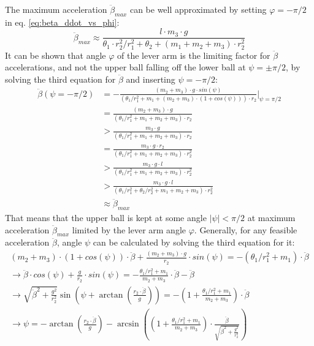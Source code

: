\documentclass{article}
\begin{document}
The maximum acceleration $\ddot{\beta}_{max}$ can be well approximated by setting $\varphi = -\pi/2$ in eq. \ref{eq:beta_ddot_vs_phi}:
\begin{equation}
\ddot{\beta}_{max} \approx \frac{l \cdot m_3 \cdot g}{\theta_1 \cdot r_2^2/r_1^2 + \theta_2 + (m_1 + m_2 + m_3) \cdot r_2^2}
\label{eq:beta_ddot_max}
\end{equation}
It can be shown that angle $\varphi$ of the lever arm is the limiting factor for $\ddot{\beta}$ accelerations, and not the upper ball falling off the lower ball at $\psi = \pm \pi/2$, by solving the third equation for $\ddot{\beta}$ and inserting $\psi = -\pi/2$:
\begin{align*}
\ddot{\beta}(\psi=-\pi/2) &= -\frac{(m_2+m_3) \cdot g \cdot sin(\psi)}{(\theta_1/r_1^2  + m_1 + (m_2+m_3) \cdot (1+cos(\psi))) \cdot r_2} \Big|_{\psi=\pi/2} \\
&= \frac{(m_2+m_3) \cdot g}{(\theta_1/r_1^2  + m_1 + m_2 + m_3) \cdot r_2} \\
&> \frac{m_3 \cdot g}{(\theta_1/r_1^2  + m_1 + m_2 + m_3) \cdot r_2} \\
&= \frac{m_3 \cdot g \cdot r_2}{(\theta_1/r_1^2  + m_1 + m_2 + m_3) \cdot r_2^2} \\
&> \frac{m_3 \cdot g \cdot l}{(\theta_1/r_1^2  + m_1 + m_2 + m_3) \cdot r_2^2} \\
&> \frac{m_3 \cdot g \cdot l}{(\theta_1/r_1^2 + \theta_2/r_2^2 + m_1 + m_2 + m_3) \cdot r_2^2} \\
&\approx \ddot{\beta}_{max}
\end{align*}
That means that the upper ball is kept at some angle $|\psi|<\pi/2$ at maximum acceleration $\ddot{\beta}_{max}$ limited by the lever arm angle $\varphi$.
Generally, for any feasible acceleration $\ddot{\beta}$, angle $\psi$ can be calculated by solving the third equation for it:
\begin{align}
(m_2+m_3) \cdot (1+cos(\psi)) \cdot \ddot{\beta} + \frac{(m_2+m_3) \cdot g}{r_2} \cdot sin(\psi) = -(\theta_1/r_1^2  + m_1) \cdot \ddot{\beta} \nonumber \\
\rightarrow \ddot{\beta} \cdot cos(\psi) + \frac{g}{r_2} \cdot sin(\psi) = -\frac{\theta_1/r_1^2  + m_1}{m_2+m_3} \cdot \ddot{\beta} - \ddot{\beta} \nonumber \\
\rightarrow \sqrt{\ddot{\beta}^2 + \frac{g^2}{r_2^2}} \sin{\left( \psi + \arctan{\left( \frac{r_2 \cdot \ddot{\beta}}{g}\right)}\right)} = -\left( 1 + \frac{\theta_1/r_1^2  + m_1}{m_2+m_3} \right) \cdot \ddot{\beta} \nonumber \\
\rightarrow \psi = - \arctan{\left( \frac{r_2 \cdot \ddot{\beta}}{g}\right)} -\arcsin{\left(\left( 1 + \frac{\theta_1/r_1^2  + m_1}{m_2+m_3} \right) \cdot \frac{\ddot{\beta}}{\sqrt{\ddot{\beta}^2 + \frac{g^2}{r_2^2}}} \right)}
\label{eq:psi_vs_beta_ddot}
\end{align}
\end{document}
